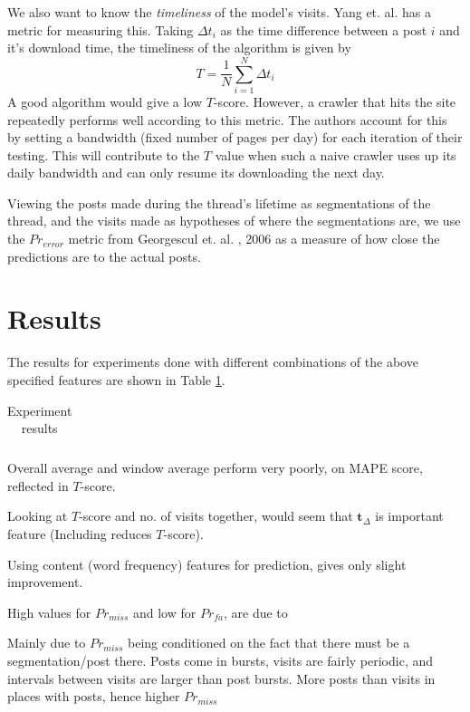 \documentclass[12 pt]{article}
\begin{document}
We also want to know the \emph{timeliness} of the model's visits. Yang et. al. \cite{Yang2009} has a metric for measuring this. Taking $\Delta t_i$ as the time difference between a post $i$ and it's download time, the timeliness of the algorithm is given by
\[T = \frac{1}{N} \sum^{N}_{i=1}\Delta t_i\]
A good algorithm would give a low $T$-score. However, a crawler that hits the site repeatedly performs well according to this metric. The authors account for this by setting a bandwidth (fixed number of pages per day) for each iteration of their testing. This will contribute to the $T$ value when such a naive crawler uses up its daily bandwidth and can only resume its downloading the next day.

Viewing the posts made during the thread's lifetime as segmentations of the thread, and the visits made as hypotheses of where the segmentations are, we use the $Pr_{error}$ metric from Georgescul et. al. , 2006 as a measure of how close the predictions are to the actual posts.



\section{Results}

The results for experiments done with different combinations of the above specified features are shown in Table \ref{expt1}.
\begin{table}
	\footnotesize
	\begin{centering}
	\begin{tabular}{|l|c|c|c|c|c|c|c|c|}
	\hline
	
	\hline
	\end{tabular}
	\caption{Experiment results}
	\label{expt1}
\end{centering}
\end{table}

Overall average and window average perform very poorly, on MAPE score, reflected in $T$-score.

Looking at $T$-score and no. of visits together, would seem that $\textbf{t}_\Delta$ is important feature (Including reduces $T$-score).

Using content (word frequency) features for prediction, gives only slight improvement.

High values for $Pr_{miss}$ and low for $Pr_{fa}$, are due to

	Mainly due to $Pr_{miss}$ being conditioned on the fact that there must be a segmentation/post there.
	Posts come in bursts, visits are fairly periodic, and intervals between visits are larger than post bursts.
	More posts than visits in places with posts, hence higher $Pr_{miss}$
\end{document}
